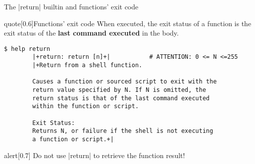 \begin{frame}[fragile]{The \bash|return| builtin and functions' exit code}
    \vspace{-3mm}
    \begin{varblock}{quote}[0.6\textwidth]{Functions' exit code}
        \textnormal{When executed, the exit status of a function is the exit status of the \textbf{last command executed} in the body.}
    \end{varblock}
    \begin{lstlisting}[style=MyBash, numbers=none]
        $ help return
        |+return: return [n]+|           # ATTENTION: 0 <= N <=255
        |+Return from a shell function.

        Causes a function or sourced script to exit with the
        return value specified by N. If N is omitted, the
        return status is that of the last command executed
        within the function or script.

        Exit Status:
        Returns N, or failure if the shell is not executing
        a function or script.+|
    \end{lstlisting}
    \medskip
    \begin{varblock}{alert}[0.7\textwidth]{}
        \large \alert{Do not use \bash|return| to retrieve the function result!}
    \end{varblock}
\end{frame}
